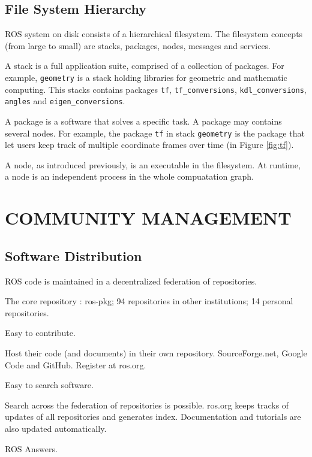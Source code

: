 \documentclass[a4paper, 10pt, conference]{ieeeconf}       %
\begin{document}
\subsection{File System Hierarchy}

ROS system on disk consists of a hierarchical filesystem. The filesystem concepts (from large to small) are stacks, packages, nodes, messages and services.

A stack is a full application suite, comprised of a collection of packages. For example, \texttt{geometry} is a stack holding libraries for geometric and mathematic computing. This stacks contains packages \texttt{tf}, \texttt{tf\_conversions}, \texttt{kdl\_conversions}, \texttt{angles} and \texttt{eigen\_conversions}.

A package is a software that solves a specific task. A package may contains several nodes. For example, the package \texttt{tf} in stack \texttt{geometry} is the package that let users keep track of multiple coordinate frames over time (in Figure \ref{fig:tf}).
  
A node, as introduced previously, is an executable in the filesystem. At runtime, a node is an independent process in the whole compuatation graph.

\section{COMMUNITY MANAGEMENT}

\subsection{Software Distribution}

   ROS code is maintained in a decentralized federation of repositories.
  
     The core repository : ros-pkg;
     94 repositories in other institutions;
     14 personal repositories.
  
   Easy to contribute.
  
     Host their code (and documents) in their own repository.
     SourceForge.net, Google Code and GitHub.
     Register at ros.org.
  
   Easy to search software.
  
     Search across the federation of repositories is possible.
     ros.org keeps tracks of updates of all repositories and generates index.
     Documentation and tutorials are also updated automatically.


   ROS Answers.
\end{document}
